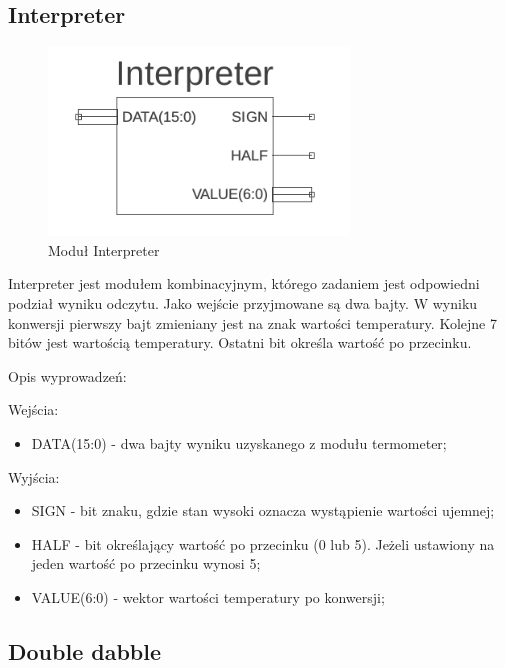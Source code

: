 \documentclass[a4paper]{article}
\begin{document}
\subsection{Interpreter}

\begin{figure}[H]
\begin{center}
\includegraphics[height=5cm]{graphics/interpreter_sym.png}
\end{center}
\caption{Moduł Interpreter}
\label{interpreter_sym}
\end{figure}

Interpreter jest modułem kombinacyjnym, którego zadaniem jest odpowiedni podział wyniku odczytu. Jako wejście przyjmowane są dwa bajty. W wyniku konwersji pierwszy bajt zmieniany jest na znak wartości temperatury. Kolejne 7 bitów jest wartością temperatury. Ostatni bit określa wartość po przecinku. 

Opis wyprowadzeń:

Wejścia:
\begin{itemize}
\item DATA(15:0) - dwa bajty wyniku uzyskanego z modułu termometer;
\end{itemize}


Wyjścia:
\begin{itemize}
\item SIGN - bit znaku, gdzie stan wysoki oznacza wystąpienie wartości ujemnej;
\item HALF - bit określający wartość po przecinku (0 lub 5). Jeżeli ustawiony na jeden wartość po przecinku wynosi 5;
\item VALUE(6:0) - wektor wartości temperatury po konwersji;
\end{itemize}

\subsection{Double dabble}
\end{document}
